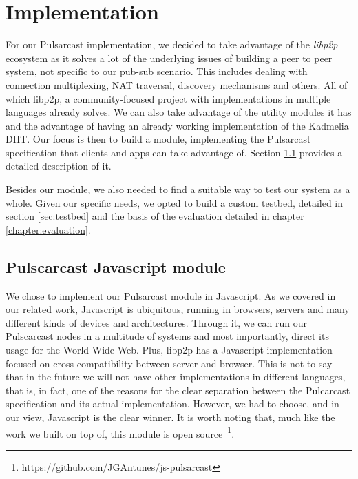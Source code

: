 
\chapter{Implementation}
\label{chapter:implementation}

For our Pulsarcast implementation, we decided to take advantage of the
\emph{libp2p} ecosystem as it solves a lot of the underlying issues of building
a peer to peer system, not specific to our pub-sub scenario. This includes
dealing with connection multiplexing, NAT traversal, discovery mechanisms and
others.  All of which libp2p, a community-focused project with implementations
in multiple languages already solves. We can also take advantage of the utility
modules it has and the advantage of having an already working implementation of
the Kadmelia DHT. Our focus is then to build a module, implementing the
Pulsarcast specification that clients and apps can take advantage of. Section
\ref{pulsarcast-javascript-module} provides a detailed description of it.

Besides our module, we also needed to find a suitable way to test our system as
a whole. Given our specific needs, we opted to build a custom testbed, detailed
in section \ref{sec:testbed} and the basis of the evaluation detailed in chapter
\ref{chapter:evaluation}. 

\section{Pulscarcast Javascript module}\label{pulsarcast-javascript-module}

We chose to implement our Pulsarcast module in Javascript. As we covered in our
related work, Javascript is ubiquitous, running in browsers, servers and many
different kinds of devices and architectures. Through it, we can run our
Pulscarcast nodes in a multitude of systems and most importantly, direct its
usage for the World Wide Web. Plus, libp2p has a Javascript implementation
focused on cross-compatibility between server and browser. This is not to say
that in the future we will not have other implementations in different
languages, that is, in fact, one of the reasons for the clear separation
between the Pulcarcast specification and its actual implementation.  However,
we had to choose, and in our view, Javascript is the clear winner. It is worth
noting that, much like the work we built on top of, this module is open
source~\footnote{https://github.com/JGAntunes/js-pulsarcast}.

